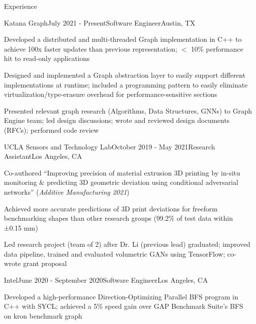 \documentclass[ 11pt ]{resume}
\begin{document}
\begin{rSection}{Experience}

	\begin{rSubsection}{Katana Graph}{July 2021 - Present}{Software Engineer}{Austin, TX}
		\item Developed a distributed and multi-threaded Graph implementation in C++ to achieve 100x faster updates than previous representation; $<$ 10\% performance hit to read-only applications
		\item Designed and implemented a Graph abstraction layer to easily support different implementations at runtime; included a programming pattern to easily eliminate virtualization/type-erasure overhead for performance-sensitive sections
		\item Presented relevant graph research (Algorithms, Data Structures, GNNs) to Graph Engine team; led design discussions; wrote and reviewed design documents (RFCs); performed code review
	\end{rSubsection}


	\begin{rSubsection}{UCLA Sensors and Technology Lab}{October 2019 - May 2021}{Research Assistant}{Los Angeles, CA}
		\item Co-authored “Improving precision of material extrusion 3D printing by in-situ monitoring \& predicting 3D geometric deviation using conditional adversarial networks” (\textit{Additive Manufacturing 2021})
		\item Achieved more accurate predictions of 3D print deviations for freeform benchmarking shapes than other research groups (99.2\% of test data within ±0.15 mm)
		\item Led research project (team of 2) after Dr. Li (previous lead) graduated; improved data pipeline, trained and evaluated volumetric GANs using TensorFlow; co-wrote grant proposal
	\end{rSubsection}


	\begin{rSubsection}{Intel}{June 2020 - September 2020}{Software Engineer}{Los Angeles, CA}
		\item Developed a high-performance Direction-Optimizing Parallel BFS program in C++ with SYCL; achieved a 5\% speed gain over GAP Benchmark Suite’s BFS on kron benchmark graph
	\end{rSubsection}

\end{rSection}
\end{document}

